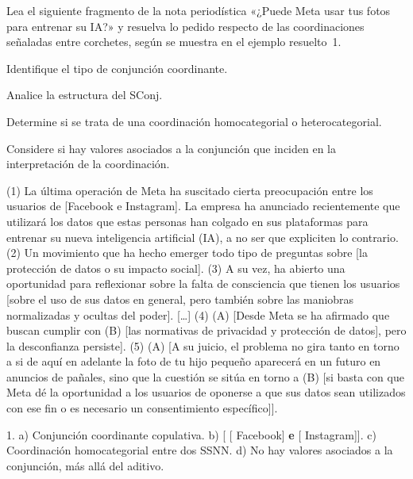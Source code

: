 \begin{ejercicio}[Integración]\label{ej:12-meta}
Lea el siguiente fragmento de la nota periodística «¿Puede Meta usar tus fotos
para entrenar su IA?» y resuelva lo pedido respecto de las coordinaciones
señaladas entre corchetes, según se muestra en el ejemplo resuelto~1.

\begin{consignas}
  \item Identifique el tipo de conjunción coordinante.
  \item Analice la estructura del SConj.
  \item Determine si se trata de una coordinación homocategorial o
        heterocategorial.
  \item Considere si hay valores asociados a la conjunción que inciden en la
        interpretación de la coordinación.
\end{consignas}

\begin{textolectura}
(1) La última operación de Meta ha suscitado cierta preocupación entre los
usuarios de [Facebook e Instagram]. La empresa ha anunciado recientemente que
utilizará los datos que estas personas han colgado en sus plataformas para
entrenar su nueva inteligencia artificial (IA), a no ser que expliciten lo
contrario. (2) Un movimiento que ha hecho emerger todo tipo de preguntas sobre
[la protección de datos o su impacto social]. (3) A su vez, ha abierto una
oportunidad para reflexionar sobre la falta de consciencia que tienen los
usuarios [sobre el uso de sus datos en general, pero también sobre las maniobras
normalizadas y ocultas del poder]. [\ldots] (4) (A) [Desde Meta se ha afirmado
que buscan cumplir con (B) [las normativas de privacidad y protección de datos],
pero la desconfianza persiste]. (5) (A) [A su juicio, el problema no gira tanto
en torno a si de aquí en adelante la foto de tu hijo pequeño aparecerá en un
futuro en anuncios de pañales, sino que la cuestión se sitúa en torno a (B) [si
basta con que Meta dé la oportunidad a los usuarios de oponerse a que sus datos
sean utilizados con ese fin o es necesario un consentimiento específico]].
\end{textolectura}

\begin{resuelto}
1. a) Conjunción coordinante copulativa. b) [ [
Facebook] \textbf{e} [ Instagram]]. c) Coordinación
homocategorial entre dos SSNN. d) No hay valores asociados a la conjunción, más
allá del aditivo.
\end{resuelto}
\end{ejercicio}

